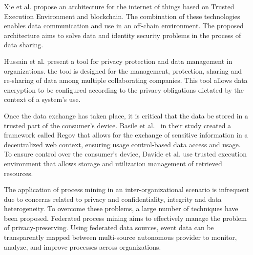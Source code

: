 Xie et al.\cite{XIE2023321} propose an architecture for the internet of things based on Trusted Execution Environment and blockchain. The combination of these technologies enables data communication and use in an off-chain environment. The proposed architecture aims to solve data and identity security problems in the process of data sharing.

Hussain et al.\cite{hussain2021sharing} present a tool for privacy protection and data management in organizations. the tool is designed for the management, protection, sharing and re-sharing of data among multiple collaborating companies. This tool allows data encryption to be configured according to the privacy obligations dictated by the context of a system's use. 

Once the data exchange has taken place, it is critical that the data be stored in a trusted part of the consumer's device. Basile et al.~\cite{Basile_Blockchain_based_resource_governance_for_decentralized_web_environments} in their study created a framework called Regov that allows for the exchange of sensitive information in a decentralized web context, ensuring usage control-based data access and usage. To ensure control over the consumer's device, Davide et al. use trusted execution environment that allows storage and utilization management of retrieved resources. 

The application of process mining in an inter-organizational scenario is infrequent due to concerns related to privacy and confidentiality, integrity and data heterogeneity. To overcome these problems, a large number of techniques have been proposed. Federated process mining \cite{van2021federated} aims to effectively manage the problem of privacy-preserving. Using federated data sources, event data can be transparently mapped between multi-source autonomous provider to monitor, analyze, and improve processes across organizations.

